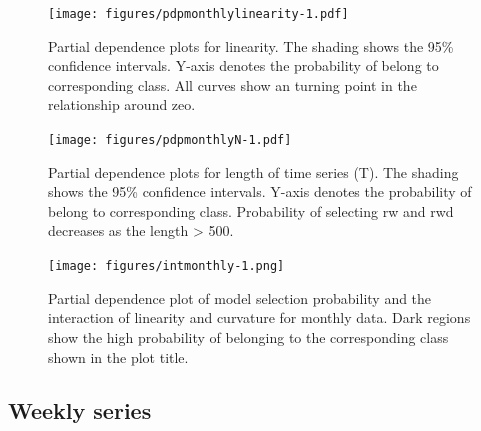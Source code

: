 \documentclass[11pt,a4paper,]{article}
\begin{document}
\begin{figure}
\centering
\texttt{[image: figures/pdpmonthlylinearity-1.pdf]}
\caption{\label{fig:pdpmonthlylinearity}Partial dependence plots for linearity. The shading shows the 95\% confidence intervals. Y-axis denotes the probability of belong to corresponding class. All curves show an turning point in the relationship around zeo.}
\end{figure}

\begin{figure}
\centering
\texttt{[image: figures/pdpmonthlyN-1.pdf]}
\caption{\label{fig:pdpmonthlyN}Partial dependence plots for length of time series (T). The shading shows the 95\% confidence intervals. Y-axis denotes the probability of belong to corresponding class. Probability of selecting rw and rwd decreases as the length \textgreater{} 500.}
\end{figure}

\begin{figure}
\centering
\texttt{[image: figures/intmonthly-1.png]}
\caption{\label{fig:intmonthly}Partial dependence plot of model selection probability and the interaction of linearity and curvature for monthly data. Dark regions show the high probability of belonging to the corresponding class shown in the plot title.}
\end{figure}

\hypertarget{weekly-series}{%
\subsection{Weekly series}\label{weekly-series}}
\end{document}
